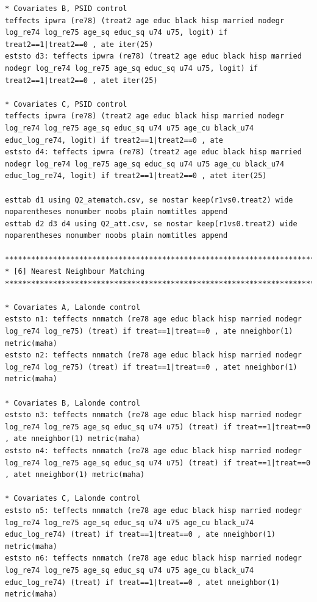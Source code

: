 \documentclass[12pt]{article}
\begin{document}
\begin{verbatim}
* Covariates B, PSID control
teffects ipwra (re78) (treat2 age educ black hisp married nodegr log_re74 log_re75 age_sq educ_sq u74 u75, logit) if treat2==1|treat2==0 , ate iter(25)
eststo d3: teffects ipwra (re78) (treat2 age educ black hisp married nodegr log_re74 log_re75 age_sq educ_sq u74 u75, logit) if treat2==1|treat2==0 , atet iter(25)

* Covariates C, PSID control
teffects ipwra (re78) (treat2 age educ black hisp married nodegr log_re74 log_re75 age_sq educ_sq u74 u75 age_cu black_u74 educ_log_re74, logit) if treat2==1|treat2==0 , ate 
eststo d4: teffects ipwra (re78) (treat2 age educ black hisp married nodegr log_re74 log_re75 age_sq educ_sq u74 u75 age_cu black_u74 educ_log_re74, logit) if treat2==1|treat2==0 , atet iter(25)

esttab d1 using Q2_atematch.csv, se nostar keep(r1vs0.treat2) wide noparentheses nonumber noobs plain nomtitles append
esttab d2 d3 d4 using Q2_att.csv, se nostar keep(r1vs0.treat2) wide noparentheses nonumber noobs plain nomtitles append

********************************************************************************
* [6] Nearest Neighbour Matching
********************************************************************************

* Covariates A, Lalonde control
eststo n1: teffects nnmatch (re78 age educ black hisp married nodegr log_re74 log_re75) (treat) if treat==1|treat==0 , ate nneighbor(1) metric(maha)
eststo n2: teffects nnmatch (re78 age educ black hisp married nodegr log_re74 log_re75) (treat) if treat==1|treat==0 , atet nneighbor(1) metric(maha)

* Covariates B, Lalonde control
eststo n3: teffects nnmatch (re78 age educ black hisp married nodegr log_re74 log_re75 age_sq educ_sq u74 u75) (treat) if treat==1|treat==0 , ate nneighbor(1) metric(maha)
eststo n4: teffects nnmatch (re78 age educ black hisp married nodegr log_re74 log_re75 age_sq educ_sq u74 u75) (treat) if treat==1|treat==0 , atet nneighbor(1) metric(maha)

* Covariates C, Lalonde control
eststo n5: teffects nnmatch (re78 age educ black hisp married nodegr log_re74 log_re75 age_sq educ_sq u74 u75 age_cu black_u74 educ_log_re74) (treat) if treat==1|treat==0 , ate nneighbor(1) metric(maha)
eststo n6: teffects nnmatch (re78 age educ black hisp married nodegr log_re74 log_re75 age_sq educ_sq u74 u75 age_cu black_u74 educ_log_re74) (treat) if treat==1|treat==0 , atet nneighbor(1) metric(maha)


\end{verbatim}
\end{document}
